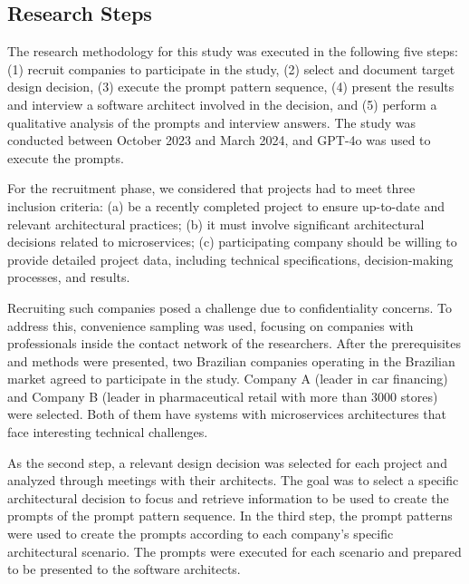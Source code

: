 \documentclass[runningheads]{llncs}
\begin{document}
\subsection{Research Steps}

The research methodology for this study was executed in the following five steps: (1) recruit companies to participate in the study, (2) select and document target design decision, (3) execute the prompt pattern sequence, (4) present the results and interview a software architect involved in the decision, and (5) perform a qualitative analysis of the prompts and interview answers. The study was conducted between October 2023 and March 2024, and GPT-4o was used to execute the prompts.


For the recruitment phase, we considered that projects had to meet three inclusion criteria: (a) be a recently completed project to ensure up-to-date and relevant architectural practices; (b) it must involve significant architectural decisions related to microservices; (c) participating company should be willing to provide detailed project data, including technical specifications, decision-making processes, and results.

Recruiting such companies posed a challenge due to confidentiality concerns\cite{runeson2012case}. To address this, convenience sampling was used, focusing on companies with professionals inside the contact network of the researchers\cite{marshall1996sampling}. After the prerequisites and methods were presented, two Brazilian companies operating in the Brazilian market agreed to participate in the study. Company A (leader in car financing) and Company B (leader in pharmaceutical retail with more than 3000 stores) were selected. Both of them have systems with microservices architectures that face interesting technical challenges.

As the second step, a relevant design decision was selected for each project and analyzed through meetings with their architects. The goal was to select a specific architectural decision to focus and retrieve information to be used to create the prompts of the prompt pattern sequence. In the third step, the prompt patterns were used to create the prompts according to each company’s specific architectural scenario. The prompts were executed for each scenario and prepared to be presented to the software architects.
\end{document}
